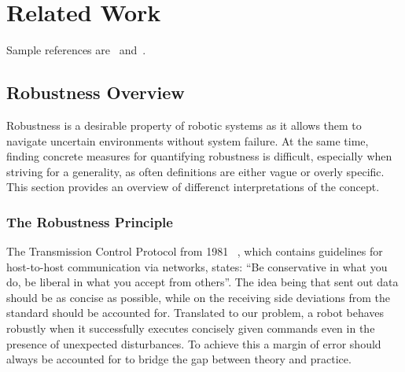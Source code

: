 \setcounter{chapter}{1}

\chapter{Related Work}

Sample references are~\cite{Zwicker04Perspective} and~\cite{Altman89QuaternionScandal}.



\section{Robustness Overview} \label{Robustness Overview}
Robustness is a desirable property of robotic systems as it allows them to navigate uncertain environments without system failure. At the same time, finding concrete measures for quantifying robustness is difficult, especially when striving for a generality, as often definitions are either vague or overly specific.
This section provides an overview of differenct interpretations of the concept. 



\subsection{The Robustness Principle} \label{The Robustness Principle}
The Transmission Control Protocol from 1981 ~\cite{trm}, which contains guidelines for host-to-host communication via networks, states: “Be conservative in what you do, be liberal in what you accept from others”. The idea being that sent out data should be as concise as possible, while on the receiving side deviations from the standard should be accounted for. Translated to our problem, a robot behaves robustly when it successfully executes concisely given commands even in the presence of unexpected disturbances. To achieve this a margin of error should always be accounted for to bridge the gap between theory and practice.




